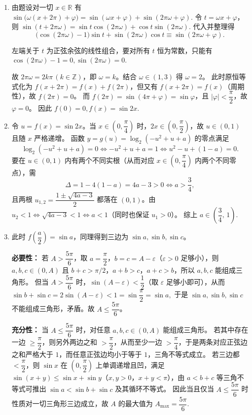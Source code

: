 \documentclass[10pt]{exam-zh}
\begin{document}
\begin{enumerate}
	\item  由题设对一切 $x\in\mathbb{R}$ 有\( \sin\bigl(\omega(x+2\pi)+\varphi\bigr)=\sin(\omega x+\varphi)+\sin(2\pi\omega+\varphi).\)
令 $t=\omega x+\varphi$，则 \( \sin(t+2\pi\omega)=\sin t\cos(2\pi\omega)+\cos t\sin(2\pi\omega).\)
代入并整理得
\[
\bigl(\cos(2\pi\omega)-1\bigr)\sin t+\sin(2\pi\omega)\cos t\equiv \sin(2\pi\omega+\varphi).
\]

左端关于 $t$ 为正弦余弦的线性组合，要对所有 $t$ 恒为常数，只能有
\(\cos(2\pi\omega)-1=0,\sin(2\pi\omega)=0.\)

故 $2\pi\omega=2k\pi\,(k\in\mathbb{Z})$，即 $\omega=k$。结合 $\omega\in(1,3)$ 得 $\omega=2$。
此时原恒等式化为 $f(x+2\pi)=f(x)+f(2\pi)$，但又有 $f(x+2\pi)=f(x)$（周期性），故 $f(2\pi)=0$。
而 $f(2\pi)=\sin(4\pi+\varphi)=\sin\varphi$，且 $|\varphi|<\dfrac{\pi}{2}$，故 $\varphi=0$。
因此
\(
f(0)=0, f(x)=\sin 2x.
\)

\item  令 $u=f(x)=\sin 2x$。当 $x\in\left(0,\dfrac{\pi}{4}\right)$ 时，$2x\in\left(0,\dfrac{\pi}{2}\right)$，故 $u\in(0,1)$ 且随 $x$ 严格递增。
函数 $y=g(u)=\log_2(-u^2+u+a)$ 的零点满足
\[
\log_2(-u^2+u+a)=0\iff -u^2+u+a=1\iff u^2-u+(1-a)=0.
\]
要在 $u\in(0,1)$ 内有两个不同实根（从而对应 $x\in\left(0,\dfrac{\pi}{4}\right)$ 内两个不同零点），需
\[
\Delta=1-4(1-a)=4a-3>0\iff a>\dfrac{3}{4},
\]
且两根
\(
u_{1,2}=\dfrac{1\pm\sqrt{4a-3}}{2}
\)
都落在 $(0,1)$。由 $u_2<1\iff \sqrt{4a-3}<1\iff a<1$（同时也保证 $u_1>0$）。
综上
\(
a\in\left(\dfrac{3}{4},\,1\right).
\)

\item  此时 $f\!\left(\dfrac{a}{2}\right)=\sin a$，同理得到三边为 $\sin a,\sin b,\sin c$。

\textbf{必要性：} 若 $A>\dfrac{5\pi}{6}$，取 $a=\dfrac{\pi}{2}$，$b=c=A-\varepsilon$（$\varepsilon>0$ 足够小），则 $a,b,c\in(0,A)$ 且 $b+c>\pi/2$，$a+b>c$，$a+c>b$，所以 $a,b,c$ 能组成三角形。
但当 $A>\dfrac{5\pi}{6}$ 时，$\sin(A-\varepsilon)<\dfrac{1}{2}$（取 $\varepsilon$ 足够小即可），从而
\(
\sin b+\sin c=2\sin(A-\varepsilon)<1=\sin\dfrac{\pi}{2}=\sin a,
\)
于是 $\sin a,\sin b,\sin c$ 不能组成三角形，矛盾。故 $A\le \dfrac{5\pi}{6}$。

\textbf{充分性：} 当 $A\le\dfrac{5\pi}{6}$ 时，对任意 $a,b,c\in(0,A)$ 能组成三角形。
若其中存在一边 $\ge\dfrac{\pi}{2}$，则另外两边之和 $>\dfrac{\pi}{2}$，从而至少一边 $>\dfrac{\pi}{4}$，于是两条对应正弦边之和严格大于 $1$，而任意正弦边均小于等于 $1$，三角不等式成立。
若三边都 $<\dfrac{\pi}{2}$，则 $\sin x$ 在 $(0,\dfrac{\pi}{2})$ 上单调递增且凹，满足 $\sin(x+y)\le \sin x+\sin y$（$x,y>0$，$x+y<\pi$），由 $a<b+c$ 等三角不等式可推出 $\sin a<\sin b+\sin c$ 及其循环不等式。
因此当且仅当 $A\le\dfrac{5\pi}{6}$ 时性质对一切三角形三边成立，故 $A$ 的最大值为
\(
A_{\max}=\dfrac{5\pi}{6}.
\)
\end{enumerate}
\end{document}
